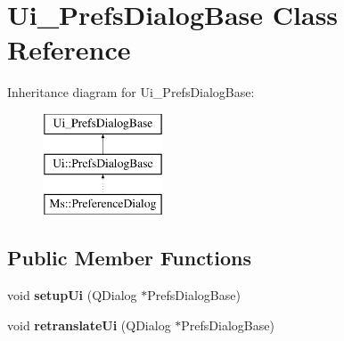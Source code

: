 \hypertarget{class_ui___prefs_dialog_base}{}\section{Ui\+\_\+\+Prefs\+Dialog\+Base Class Reference}
\label{class_ui___prefs_dialog_base}
Inheritance diagram for Ui\+\_\+\+Prefs\+Dialog\+Base\+:\begin{figure}[H]
\begin{center}
\leavevmode
\includegraphics[height=3.000000cm]{class_ui___prefs_dialog_base}
\end{center}
\end{figure}
\subsection*{Public Member Functions}
\begin{DoxyCompactItemize}
\item 
\mbox{\label{class_ui___prefs_dialog_base_a03de22764d81f397de7e453759d372f8}} 
void {\bfseries setup\+Ui} (Q\+Dialog $\ast$Prefs\+Dialog\+Base)
\item 
\mbox{\label{class_ui___prefs_dialog_base_a80859674619e80ce8ae305f8aae38566}} 
void {\bfseries retranslate\+Ui} (Q\+Dialog $\ast$Prefs\+Dialog\+Base)
\end{DoxyCompactItemize}
